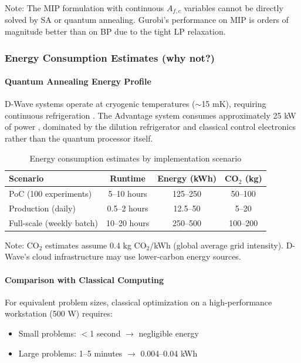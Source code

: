 \documentclass{oqireport}
\begin{document}
Note: The MIP formulation with continuous $A_{f,c}$ variables cannot be directly solved by SA or quantum annealing. Gurobi's performance on MIP is orders of magnitude better than on BP due to the tight LP relaxation.



\subsubsection{Energy Consumption Estimates (why not?)}

\paragraph{Quantum Annealing Energy Profile}

D-Wave systems operate at cryogenic temperatures ($\sim$15 mK), requiring continuous refrigeration \cite{johnson2011quantum}. The Advantage system consumes approximately 25 kW of power \cite{dwave_sustainability, fellous2022limitations}, dominated by the dilution refrigerator and classical control electronics rather than the quantum processor itself.

\begin{table}[H]
\centering
\caption{Energy consumption estimates by implementation scenario}
\label{tab:energy_estimates}
\begin{tabular}{@{}lccc@{}}
\toprule
\textbf{Scenario} & \textbf{Runtime} & \textbf{Energy (kWh)} & \textbf{CO$_2$ (kg)} \\
\midrule
PoC (100 experiments) & 5--10 hours & 125--250 & 50--100 \\
Production (daily) & 0.5--2 hours & 12.5--50 & 5--20 \\
Full-scale (weekly batch) & 10--20 hours & 250--500 & 100--200 \\
\bottomrule
\end{tabular}
\end{table}

Note: CO$_2$ estimates assume 0.4 kg CO$_2$/kWh (global average grid intensity). D-Wave's cloud infrastructure may use lower-carbon energy sources.

\paragraph{Comparison with Classical Computing}

For equivalent problem sizes, classical optimization on a high-performance workstation (500 W) requires:
\begin{itemize}
    \item Small problems: $<$1 second $\rightarrow$ negligible energy
    \item Large problems: 1--5 minutes $\rightarrow$ 0.004--0.04 kWh
\end{itemize}
\end{document}
